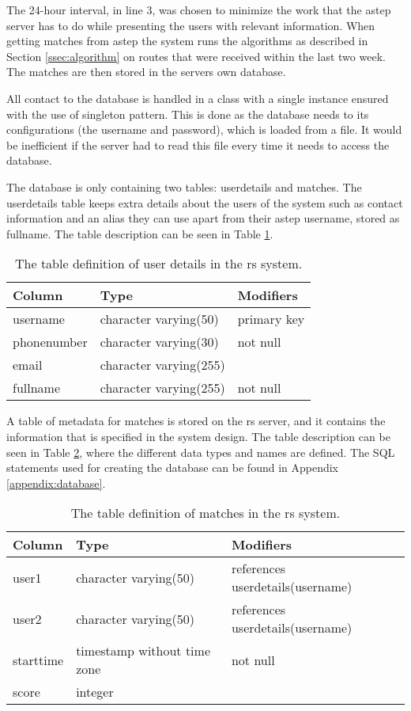 The 24-hour interval, in line 3, was chosen to minimize the work that the \gls{astep} server has to do while presenting the users with relevant information.
When getting matches from \gls{astep} the system runs the algorithms as described in Section \ref{ssec:algorithm} on routes that were received within the last two week.
The matches are then stored in the servers own database.

All contact to the database is handled in a class with a single instance ensured with the use of singleton pattern. 
This is done as the database needs to its configurations (the username and password), which is loaded from a file.
It would be inefficient if the server had to read this file every time it needs to access the database.

The database is only containing two tables: userdetails and matches.
The userdetails table keeps extra details about the users of the system such as contact information and an alias they can use apart from their \gls{astep} username, stored as fullname.
The table description can be seen in Table \ref{tab:userdetails}.

\begin{table}[h]
	\centering
	\begin{tabular}{l l l}
		Column 		& Type                   & Modifiers\\\hline
		username    & character varying(50)  & primary key\\
		phonenumber & character varying(30)  & not null\\
		email       & character varying(255) &\\
		fullname    & character varying(255) & not null\\
	\end{tabular}
	\caption{The table definition of user details in the \gls{rs} system.}
	\label{tab:userdetails}
\end{table}

A table of metadata for matches is stored on the \gls{rs} server, and it contains the information that is specified in the system design. 
The table description can be seen in Table \ref{tab:matches}, where the different data types and names are defined.
The SQL statements used for creating the database can be found in Appendix \ref{appendix:database}.

\begin{table}[h]
	\centering
	\begin{tabular}{l l l}
			   Column  &            Type             & Modifiers\\\hline
			 user1     & character varying(50)       & references userdetails(username)\\
			 user2     & character varying(50)       & references userdetails(username)\\
			 starttime & timestamp without time zone & not null\\
			 score     & integer                     &
	\end{tabular}
	\caption{The table definition of matches in the \gls{rs} system.}
	\label{tab:matches}
\end{table}

